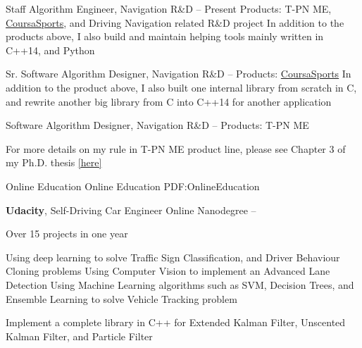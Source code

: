 \documentclass[letterpaper,MMMyyyy,nonstopmode]{simpleresumecv}
\begin{document}
\begin{Body}
\Gap
Staff Algorithm Engineer, Navigation R\&D
\hfill
{} --
Present
\BulletItem
Products:
T-PN ME, \href{http://www.coursasports.com/}{CoursaSports}, and Driving Navigation related R\&D project
\BulletItem
In addition to the products above, I also build and maintain helping tools mainly\newline 
written in C++14, and Python

\Gap
Sr. Software Algorithm Designer, Navigation R\&D
\hfill
{} --
\BulletItem
Products:
\href{http://www.coursasports.com/}{CoursaSports}
\BulletItem
In addition to the product above, I also built one internal library from scratch in C,\newline
and rewrite another big library from C into C++14 for another application

\BigGap
Software Algorithm Designer, Navigation R\&D
\hfill
{} --
\BulletItem
Products: T-PN ME

\BulletItem
For more details on my rule in T-PN ME product line,\newline
please see Chapter 3 of my Ph.D. thesis \href{https://qspace.library.queensu.ca/bitstream/handle/1974/12804/Omr_Medhat_201504_PhD.pdf?sequence=1}{[here]}


\Section
{Online \newline
Education}
{Online Education}
{PDF:OnlineEducation}

\Entry
{\textbf{Udacity}},
Self-Driving Car Engineer Online Nanodegree
\hfill
{} --

\Gap
{Over 15 projects in one year}

\BulletItem
Using deep learning to solve Traffic Sign Classification, and Driver Behaviour Cloning problems
\BulletItem
Using Computer Vision to implement an Advanced Lane Detection
\BulletItem
Using Machine Learning algorithms such as SVM, Decision Trees, and Ensemble Learning to solve Vehicle Tracking problem

\BulletItem
Implement a complete library in C++ for Extended Kalman Filter, Unscented Kalman Filter, and Particle Filter


\end{Body}
\end{document}

